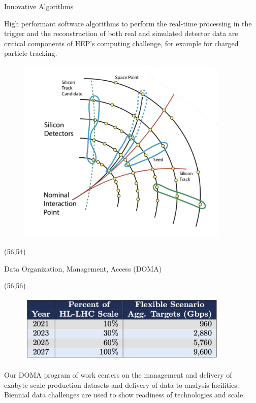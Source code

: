 \documentclass[final]{beamer}
\begin{document}
\begin{frame}{}
\begin{textblock}{25.0}
\begin{block}{Innovative Algorithms}
\begin{textblock}{25.0}
\begin{figure}[tbph]
\end{figure}
High performant software algorithms to perform the real-time processing in the trigger and the reconstruction of both real and simulated detector data are critical components of HEP’s computing challenge, for example for charged particle tracking. 
\begin{figure}[tbph]
\centering
\includegraphics[width=0.90\textwidth]{images/trackreco-graphic.png}
\end{figure}
\end{textblock}
\end{block}
\end{textblock}
\begin{textblock}{25.0}(56,54)
\begin{block}{Data Organization, Management, Access (DOMA)}
\begin{textblock}{25.0}(56,56)
\begin{figure}[tbph]
\centering
\includegraphics[width=0.90\textwidth]{images/doma-scale-challenges.png}
\end{figure}
Our DOMA program of work centers on the management and delivery of exabyte-scale production datasets and delivery of data to analysis facilities. Biennial data challenges are used to show readiness of technologies and scale.

\end{textblock}
\end{block}
\end{textblock}
\end{frame}
\end{document}
